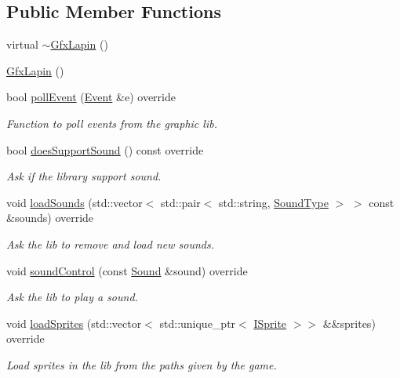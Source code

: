 \subsection*{Public Member Functions}
\begin{DoxyCompactItemize}
\item 
virtual \hyperlink{classarcade_1_1_gfx_lapin_a87275ed29f549db04dc3888ace3fc73e}{$\sim$\+Gfx\+Lapin} ()
\item 
\hyperlink{classarcade_1_1_gfx_lapin_a23c348cc21e8b935c1922bc68b1950fb}{Gfx\+Lapin} ()
\item 
bool \hyperlink{classarcade_1_1_gfx_lapin_a80f4cae576f05ddc8ab94d5a348226c5}{poll\+Event} (\hyperlink{structarcade_1_1_event}{Event} \&e) override
\begin{DoxyCompactList}\small\item\em Function to poll events from the graphic lib. \end{DoxyCompactList}\item 
bool \hyperlink{classarcade_1_1_gfx_lapin_ae84337d3ae5e24a61f160d3ac99d4e10}{does\+Support\+Sound} () const override
\begin{DoxyCompactList}\small\item\em Ask if the library support sound. \end{DoxyCompactList}\item 
void \hyperlink{classarcade_1_1_gfx_lapin_a54039353c2da52bb45b233d4b8839551}{load\+Sounds} (std\+::vector$<$ std\+::pair$<$ std\+::string, \hyperlink{namespacearcade_a3bb4743a2eea59f3927e404e6549cae5}{Sound\+Type} $>$ $>$ const \&sounds) override
\begin{DoxyCompactList}\small\item\em Ask the lib to remove and load new sounds. \end{DoxyCompactList}\item 
void \hyperlink{classarcade_1_1_gfx_lapin_ad0f1a1014b88cf7f51ea85ab99e0c87b}{sound\+Control} (const \hyperlink{structarcade_1_1_sound}{Sound} \&sound) override
\begin{DoxyCompactList}\small\item\em Ask the lib to play a sound. \end{DoxyCompactList}\item 
void \hyperlink{classarcade_1_1_gfx_lapin_a164a694063507041dbd78415898d5157}{load\+Sprites} (std\+::vector$<$ std\+::unique\+\_\+ptr$<$ \hyperlink{classarcade_1_1_i_sprite}{I\+Sprite} $>$$>$ \&\&sprites) override
\begin{DoxyCompactList}\small\item\em Load sprites in the lib from the paths given by the game. \end{DoxyCompactList}\item 
$$
\end{DoxyCompactItemize}
